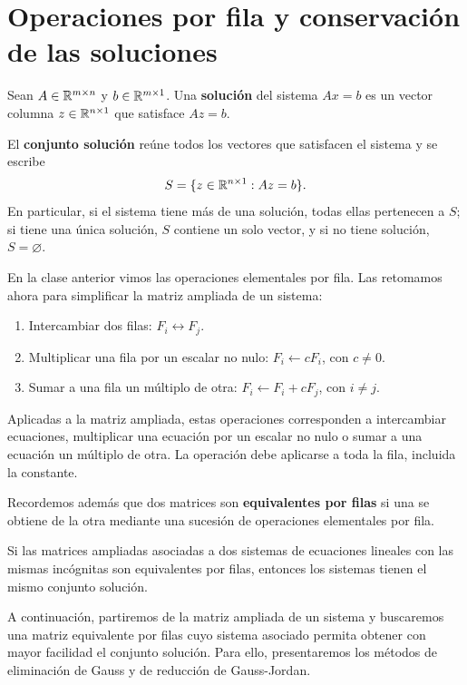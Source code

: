 \documentclass[compacto,10pt]{pubciencias-notas}
\begin{document}
\section{Operaciones por fila y conservación de las soluciones}
\begin{defi}
Sean $A\in\mathbb{R}^{m\times n}$ y $b\in\mathbb{R}^{m\times1}$. Una \textbf{solución}
del sistema $Ax=b$ es un vector columna $z\in\mathbb{R}^{n\times1}$ que satisface
$Az=b$.

El \textbf{conjunto solución} reúne todos los vectores que satisfacen el
sistema y se escribe
\[
S=\{z\in\mathbb{R}^{n\times1}:Az=b\}.
\]
En particular, si el sistema tiene más de una solución, todas ellas
pertenecen a $S$; si tiene una única solución, $S$ contiene un solo vector,
y si no tiene solución, $S=\varnothing$.
\end{defi}
En la clase anterior vimos las operaciones elementales
por fila. Las retomamos ahora para simplificar la matriz ampliada de un sistema:
\begin{enumerate}
\item Intercambiar dos filas: $F_i\leftrightarrow F_j$.
\item Multiplicar una fila por un escalar no nulo: $F_i\leftarrow cF_i$, con $c\ne0$.
\item Sumar a una fila un múltiplo de otra: $F_i\leftarrow F_i+cF_j$, con $i\ne j$.
\end{enumerate}
Aplicadas a la matriz ampliada, estas operaciones corresponden a intercambiar
ecuaciones, multiplicar una ecuación por un escalar no nulo o sumar a una
ecuación un múltiplo de otra. La operación debe aplicarse a toda la fila, incluida la constante. 

Recordemos además que dos matrices son \textbf{equivalentes por filas} si una se obtiene de la otra mediante una sucesión de operaciones elementales por fila.




\begin{prop}
Si las matrices ampliadas asociadas a dos sistemas de ecuaciones lineales
con las mismas incógnitas son equivalentes por filas, entonces los sistemas
tienen el mismo conjunto solución.
\end{prop}

A continuación, partiremos de la matriz ampliada de un sistema y buscaremos una matriz equivalente por filas cuyo sistema asociado permita obtener con mayor facilidad el conjunto solución. Para ello, presentaremos los métodos de eliminación de Gauss y de reducción de Gauss-Jordan.
\end{document}

